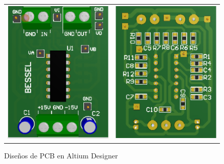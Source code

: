 \begin{figure}[H]
\begin{tabular}{c c}
		\includegraphics[scale=0.5]{../EJ1/Recursos/bessel_top_3d.PNG} & 
		\includegraphics[scale=0.5]{../EJ1/Recursos/bessel_bottom_3d.PNG}
	\end{tabular}
	\caption{Dise\~nos de PCB en Altium Designer}
	\label{fig:pcb_altium_3d}
\end{figure}

